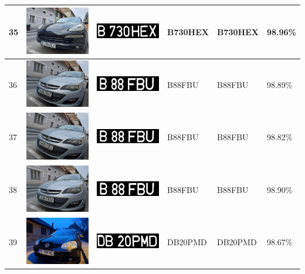 \documentclass[a4paper,12pt]{report}
\begin{document}
\begin{longtable}{| m{0.6cm} | m{3cm} | m{3cm} | m{1.8cm} | m{1.8cm} | m{1.8cm} |}
        35 & \includegraphics[width=3cm,keepaspectratio]{dataset/20_d1.jpg} & \includegraphics[width=3cm,keepaspectratio]{segmentari/35.jpg} & B730HEX & B730HEX & 98.96\% \\ \hline
        36 & \includegraphics[width=3cm,keepaspectratio]{dataset/21_d1.jpg} & \includegraphics[width=3cm,keepaspectratio]{segmentari/36.jpg} & B88FBU & B88FBU & 98.89\% \\ \hline
        37 & \includegraphics[width=3cm,keepaspectratio]{dataset/21_d2.jpg} & \includegraphics[width=3cm,keepaspectratio]{segmentari/37.jpg} & B88FBU & B88FBU & 98.82\% \\ \hline
        38 & \includegraphics[width=3cm,keepaspectratio]{dataset/21_d3.jpg} & \includegraphics[width=3cm,keepaspectratio]{segmentari/38.jpg} & B88FBU & B88FBU & 98.90\% \\ \hline
        39 & \includegraphics[width=3cm,keepaspectratio]{dataset/22_d1.jpg} & \includegraphics[width=3cm,keepaspectratio]{segmentari/39.jpg} & DB20PMD & DB20PMD & 98.67\% \\ \hline

\end{longtable}
\end{document}
